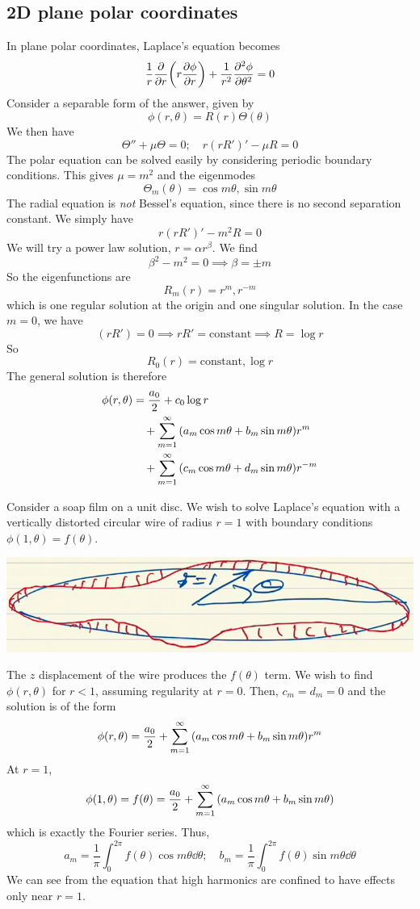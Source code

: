 \documentclass[a4paper]{article}
\begin{document}
\subsection{2D plane polar coordinates}
In plane polar coordinates, Laplace's equation becomes
\[
	\frac{1}{r} \pdv{r} \qty(r \pdv{\phi}{r}) + \frac{1}{r^2} \pdv[2]{\phi}{\theta} = 0
\]
Consider a separable form of the answer, given by
\[
	\phi(r,\theta) = R(r) \Theta(\theta)
\]
We then have
\[
	\Theta'' + \mu \Theta = 0;\quad r(rR')' - \mu R = 0
\]
The polar equation can be solved easily by considering periodic boundary conditions.
This gives \( \mu = m^2 \) and the eigenmodes
\[
	\Theta_m(\theta) = \cos m \theta, \sin m \theta
\]
The radial equation is \textit{not} Bessel's equation, since there is no second separation constant.
We simply have
\[
	r(rR')' - m^2 R = 0
\]
We will try a power law solution, \( r = \alpha r^\beta \).
We find
\[
	\beta^2 - m^2 = 0 \implies \beta = \pm m
\]
So the eigenfunctions are
\[
	R_m(r) = r^m, r^{-m}
\]
which is one regular solution at the origin and one singular solution.
In the case \( m = 0 \), we have
\[
	(rR') = 0 \implies rR' = \text{constant} \implies R = \log r
\]
So
\[
	R_0(r) = \text{constant}, \log r
\]
The general solution is therefore
\begin{align*}
    \phi(r,\theta) &= \frac{a_0}{2} + c_0 \log r \\ 
    &\quad + \sum_{m=1}^\infty \qty(a_m \cos m\theta + b_m \sin m\theta) r^m \\ 
    &\quad + \sum_{m=1}^\infty \qty(c_m \cos m\theta + d_m \sin m\theta) r^{-m}
\end{align*}
\begin{example}
	Consider a soap film on a unit disc.
	We wish to solve Laplace's equation with a vertically distorted circular wire of radius \( r = 1 \) with boundary conditions \( \phi(1, \theta) = f(\theta) \).
    \begin{center}
        \includegraphics[scale=0.4]{methods3.png}
    \end{center}
	The \( z \) displacement of the wire produces the \( f(\theta) \) term.
	We wish to find \( \phi(r,\theta) \) for \( r < 1 \), assuming regularity at \( r = 0 \).
	Then, \( c_m = d_m = 0 \) and the solution is of the form
	\[
		\phi(r,\theta) = \frac{a_0}{2} + \sum_{m=1}^\infty \qty(a_m \cos m\theta + b_m \sin m\theta) r^m
	\]
	At \( r = 1 \),
	\[
		\phi(1,\theta) = f(\theta) = \frac{a_0}{2} + \sum_{m=1}^\infty \qty(a_m \cos m\theta + b_m \sin m\theta)
	\]
	which is exactly the Fourier series.
	Thus,
	\[
		a_m = \frac{1}{\pi} \int_0^{2\pi} f(\theta) \cos m \theta \dd{\theta};\quad b_m = \frac{1}{\pi} \int_0^{2\pi} f(\theta) \sin m \theta \dd{\theta}
	\]
	We can see from the equation that high harmonics are confined to have effects only near \( r = 1 \).
\end{example}
\end{document}
